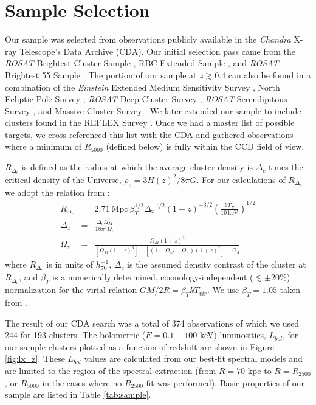 \documentclass[12pt,preprint]{aastex}
\begin{document}
\section{Sample Selection} \label{sec:selection}

Our sample was selected from observations publicly available in the
{\it Chandra} X-ray Telescope's Data Archive (CDA). Our initial
selection pass came from the {\it{ROSAT}} Brightest Cluster Sample
\citep{1998MNRAS.301..881E}, RBC Extended Sample
\citep{2000MNRAS.318..333E}, and {\it{ROSAT}} Brightest 55 Sample
\citep{1990MNRAS.245..559E, 1998MNRAS.298..416P}. The portion of our
sample at $z \gtrsim 0.4$ can also be found in a combination of the
{\it{Einstein}} Extended Medium Sensitivity Survey
\citep{1990ApJS...72..567G}, North Ecliptic Pole Survey
\citep{2006ApJS..162..304H}, {\it{ROSAT}} Deep Cluster Survey
\citep{1995ApJ...445L..11R}, {\it{ROSAT}} Serendipitous Survey
\citep{1998ApJ...502..558V}, and Massive Cluster Survey
\citep{2001ApJ...553..668E}. We later extended our sample to include
clusters found in the REFLEX Survey \citep{2004A&A...425..367B}. Once
we had a master list of possible targets, we cross-referenced this
list with the CDA and gathered observations where a minimum of
$R_{5000}$ (defined below) is fully within the CCD field of
view.

$R_{\Delta_c}$ is defined as the radius at which the average cluster
density is $\Delta_c$ times the critical density of the Universe,
$\rho_c=3H(z)^2/8\pi G$. For our calculations of $R_{\Delta_c}$ we
adopt the relation from \cite{2002A&A...389....1A}:
\begin{eqnarray}
R_{\Delta_c} &=& 2.71 \mathrm{~Mpc~}
\beta_T^{1/2}
\Delta_{\mathrm{z}}^{-1/2}
(1+z)^{-3/2}
\left(\frac{kT_X}{10 \mathrm{~keV}}\right)^{1/2}\\
\Delta_z &=& \frac{\Delta_c \Omega_M}{18\pi^2\Omega_z} \nonumber \\
\Omega_z &=& \frac{\Omega_M (1+z)^3}{[\Omega_M
(1+z)^3]+[(1-\Omega_M-\Omega_{\Lambda})(1+z)^2]+\Omega_{\Lambda}} \nonumber
\end{eqnarray}
where $R_{\Delta_c}$ is in units of $h_{70}^{-1}$, $\Delta_c$ is
the assumed density contrast of the cluster at $R_{\Delta_c}$, and
$\beta_T$ is a numerically determined, cosmology-independent
($\lesssim \pm 20\%$) normalization for the virial relation $GM/2R =
\beta_TkT_{vir}$. We use $\beta_T = 1.05$ taken from
\cite{1996ApJ...469..494E}.

The result of our CDA search was a total of 374 observations of which
we used 244 for 193 clusters. The bolometric ($E = 0.1-100$ keV)
luminosities, $L_{bol}$, for our sample clusters plotted as a function of
redshift are shown in Figure \ref{fig:lx_z}. These $L_{bol}$ values
are calculated from our best-fit spectral models and are limited to
the region of the spectral extraction (from $R=70$ kpc to
$R=R_{2500}$, or $R_{5000}$ in the cases where no $R_{2500}$ fit was
performed). Basic properties of our sample are listed in Table
\ref{tab:sample}.
\end{document}
